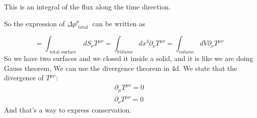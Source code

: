 \begin{minipage}[t]{0.48\textwidth}
    \vspace*{0pt} 
    This is an integral of the flux along the time direction. \par
    So the expression of $\Delta p^{\mu }_{ \text{ total }}$ can be written as \par
\end{minipage}

\[
= \int_{ \text{ total surface }}^{}{dS_{\nu }T^{\mu \nu }} = \int_{Volume}^{}{dx^{3}\partial_{\nu }T^{\mu \nu }} = \int_{volume}^{}{dV \partial_{\nu }T^{\mu \nu }}
\]
So we have two surfaces and we closed it inside a solid, and it is like we are doing Gauss theorem, We can use the divergence theorem in 4d. We state that the divergence of $T^{\mu \nu }$:
\begin{gather*}
\partial_{\mu }T^{\mu \nu } = 0 \\
\partial_{\nu }T^{\mu \nu } = 0
\end{gather*}
And that's a way to express conservation.

